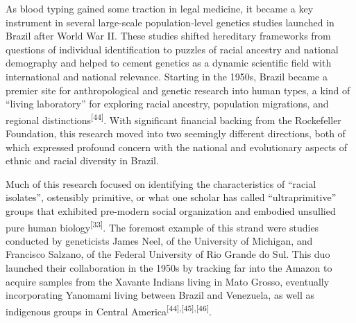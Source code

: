 \documentclass{article}
\begin{document}
As blood typing gained some traction in legal medicine, it became a key
instrument in several large-scale population-level genetics studies launched in
Brazil after World War II. These studies shifted hereditary frameworks from
questions of individual identification to puzzles of racial ancestry and
national demography and helped to cement genetics as a dynamic scientific field
with international and national relevance. Starting in the 1950s, Brazil became
a premier site for anthropological and genetic research into human types, a kind
of “living laboratory” for exploring racial ancestry, population migrations, and
regional distinctions\textsuperscript{[}\textsuperscript{44}\textsuperscript{]}. With significant financial backing from the Rockefeller Foundation, this
research moved into two seemingly different directions, both of which expressed
profound concern with the national and evolutionary aspects of ethnic and racial
diversity in Brazil.

Much of this research focused on identifying the characteristics of “racial
isolates”, ostensibly primitive, or what one scholar has called “ultraprimitive”
groups that exhibited pre-modern social organization and embodied unsullied pure
human biology\textsuperscript{[}\textsuperscript{33}\textsuperscript{]}. The foremost example of this strand were studies conducted by geneticists
James Neel, of the University of Michigan, and Francisco Salzano, of the Federal
University of Rio Grande do Sul. This duo launched their collaboration in the
1950s by tracking far into the Amazon to acquire samples from the Xavante
Indians living in Mato Grosso, eventually incorporating Yanomami living between
Brazil and Venezuela, as well as indigenous groups in Central America\textsuperscript{[}\textsuperscript{44}\textsuperscript{]}\textsuperscript{,}\textsuperscript{[}\textsuperscript{45}\textsuperscript{]}\textsuperscript{,}\textsuperscript{[}\textsuperscript{46}\textsuperscript{]}.
\end{document}

